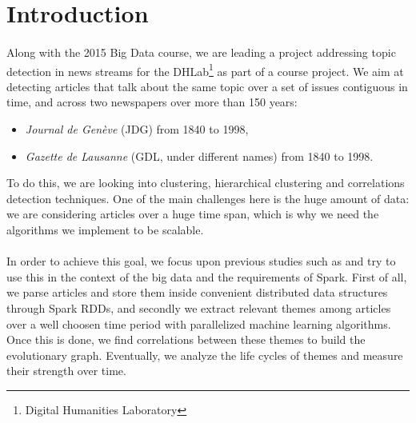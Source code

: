\section{Introduction}
\paragraph{}
Along with the 2015 Big Data course, we are leading a project addressing topic detection in news streams for the DHLab\footnote{Digital Humanities Laboratory} as part of a course project. We aim at detecting articles that talk about the same topic over a set of issues contiguous in time, and across two newspapers over more than 150 years:
\begin{itemize}
\item \emph{Journal de Genève} (JDG) from 1840 to 1998,
\item \emph{Gazette de Lausanne} (GDL, under different names) from 1840 to 1998.
\end{itemize}
To do this, we are looking into clustering, hierarchical clustering and correlations detection techniques. One of the main challenges here is the huge amount of data: we are considering articles over a huge time span, which is why we need the algorithms we implement to be scalable.

\paragraph{}
In order to achieve this goal, we focus upon previous studies such as \cite{kdd05-ttm} and try to use this in the context of the big data and the requirements of Spark.
First of all, we parse articles and store them inside convenient distributed data structures through Spark RDDs, and secondly we extract relevant themes among articles over a well choosen time period with parallelized machine learning algorithms. Once this is done, we find correlations between these themes to build the evolutionary graph. Eventually, we analyze the life cycles of themes and measure their strength over time.
